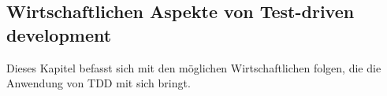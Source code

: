 \subsection{Wirtschaftlichen Aspekte von Test-driven development}\label{diskussion:wirtschaft}

Dieses Kapitel befasst sich mit den möglichen Wirtschaftlichen folgen,
die die Anwendung von TDD mit sich bringt.
